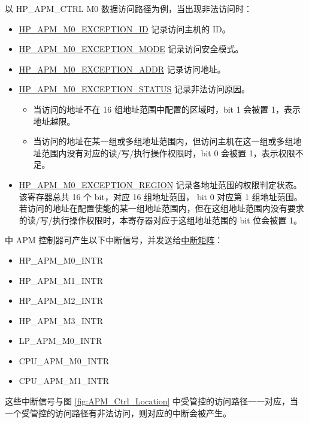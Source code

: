 \documentclass[main\_\_CN.tex]{subfiles}
\begin{document}
以 HP\_APM\_CTRL M0 数据访问路径为例，当出现非法访问时：

\begin{itemize}
    \item \hyperref[fielddesc:HPAPMM0EXCEPTIONID]{HP\_APM\_M0\_EXCEPTION\_ID} 记录访问主机的 ID。
    \item \hyperref[fielddesc:HPAPMM0EXCEPTIONMODE]{HP\_APM\_M0\_EXCEPTION\_MODE} 记录访问安全模式。
    \item \hyperref[fielddesc:HPAPMM0EXCEPTIONADDR]{HP\_APM\_M0\_EXCEPTION\_ADDR} 记录访问地址。
    \item \hyperref[fielddesc:HPAPMM0EXCEPTIONSTATUS]{HP\_APM\_M0\_EXCEPTION\_STATUS} 记录非法访问原因。
    \begin{itemize}
        \item  当访问的地址不在 16 组地址范围中配置的区域时，bit 1 会被置 1，表示地址越限。
        \item  当访问的地址在某一组或多组地址范围内，但访问主机在这一组或多组地址范围内没有对应的读/写/执行操作权限时，bit 0 会被置 1，表示权限不足。
    \end{itemize}
    \item \hyperref[fielddesc:HPAPMM0EXCEPTIONREGION]{HP\_APM\_M0\_EXCEPTION\_REGION} 记录各地址范围的权限判定状态。该寄存器总共 16 个 bit，对应 16 组地址范围， bit 0 对应第 1 组地址范围。若访问的地址在配置使能的某一组地址范围内，但在这组地址范围内没有要求的读/写/执行操作权限时，本寄存器对应于这组地址范围的 bit 位会被置 1。
\end{itemize}

\chipname{} 中 APM 控制器可产生以下中断信号，并发送给\hyperref[mod:intmtrx]{中断矩阵}：

\begin{itemize}
    \item HP\_APM\_M0\_INTR
    \item HP\_APM\_M1\_INTR
    \item HP\_APM\_M2\_INTR
    \item HP\_APM\_M3\_INTR
    \item LP\_APM\_M0\_INTR
    \item CPU\_APM\_M0\_INTR
    \item CPU\_APM\_M1\_INTR
\end{itemize}

这些中断信号与图 \ref{fig:APM_Ctrl_Location} 中受管控的访问路径一一对应，当一个受管控的访问路径有非法访问，则对应的中断会被产生。

\end{document}
